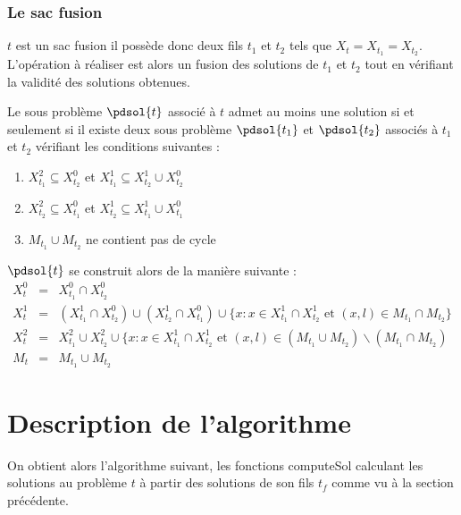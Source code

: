 \subsubsection{Le sac fusion}

$t$ est un sac fusion il possède donc deux fils $t_1$ et $t_2$ tels que $X_t = X_{t_1} = X_{t_2}$.
L'opération à réaliser est alors un fusion des solutions de $t_1$ et $t_2$ tout en vérifiant la
validité des solutions obtenues.

\begin{nlemma}
    Le sous problème $\pdsol{t}$ associé à $t$ admet au moins une solution si et seulement si il
    existe deux sous problème $\pdsol{t_1}$ et $\pdsol{t_2}$ associés à $t_1$ et $t_2$ vérifiant les
    conditions suivantes :
    \begin{enumerate}
        \item $X_{t_1}^2 \subseteq X_{t_2}^0$ et $X_{t_1}^1 \subseteq X_{t_2}^1 \cup X_{t_2}^0$
        \item $X_{t_2}^2 \subseteq X_{t_1}^0$ et $X_{t_2}^1 \subseteq X_{t_1}^1 \cup X_{t_1}^0$
        \item $M_{t_1} \cup M_{t_2}$ ne contient pas de cycle
    \end{enumerate}
    $\pdsol{t}$ se construit alors de la manière suivante :
    \[
        \begin{array}{rcl}
            X_t^0 & = & X_{t_1}^0 \cap X_{t_2}^0 \\
            X_t^1 & = & (X_{t_1}^1 \cap X_{t_2}^0) \cup (X_{t_2}^1 \cap X_{t_1}^0) \cup \{ x : x \in
            X_{t_1}^1 \cap X_{t_2}^1 \mbox{ et } (x, l) \in M_{t_1} \cap M_{t_2}\} \\
            X_t^2 & = & X_{t_1}^2 \cup X_{t_2}^2 \cup \{x : x \in X_{t_1}^1 \cap X_{t_2}^1 \mbox{ et } 
            (x,l) \in (M_{t_1} \cup M_{t_2}) \backslash (M_{t_1} \cap M_{t_2}) \\
            M_t & = & M_{t_1} \cup M_{t_2}
        \end{array}
    \]
\end{nlemma}

\section{Description de l'algorithme}

On obtient alors l'algorithme suivant, les fonctions computeSol calculant les solutions au problème
$t$ à partir des solutions de son fils $t_f$ comme vu à la section précédente.

